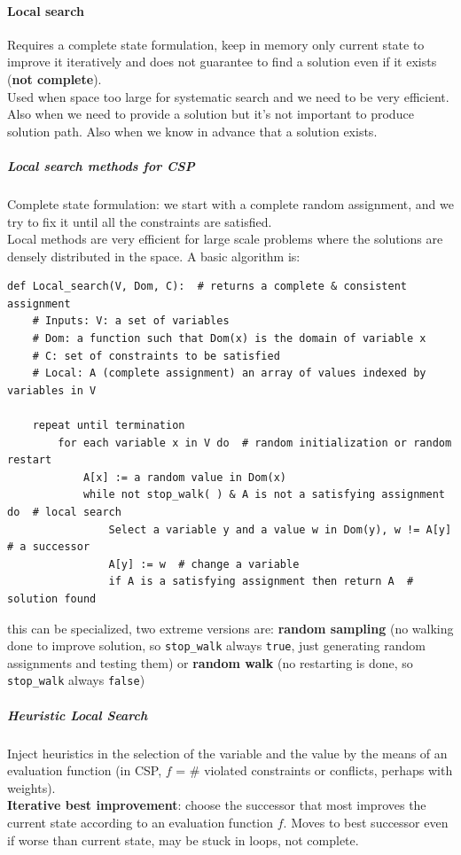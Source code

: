 \documentclass[10pt]{report}
\begin{document}
\paragraph{Local search} Requires a complete state formulation, keep in memory only current state to improve it iteratively and does not guarantee to find a solution even if it exists (\textbf{not complete}).\\
Used when space too large for systematic search and we need to be very efficient. Also when we need to provide a solution but it's not important to produce solution path. Also when we know in advance that a solution exists.
\subparagraph{Local search methods for CSP} Complete state formulation: we start with a complete random assignment, and we try to fix it until all the constraints are satisfied.\\
Local methods are very efficient for large scale problems where the solutions are densely distributed in the space. A basic algorithm is:
\begin{lstlisting}[style=myPython]
def Local_search(V, Dom, C):  # returns a complete & consistent assignment
	# Inputs: V: a set of variables
	# Dom: a function such that Dom(x) is the domain of variable x
	# C: set of constraints to be satisfied
	# Local: A (complete assignment) an array of values indexed by variables in V

	repeat until termination
		for each variable x in V do  # random initialization or random restart
			A[x] := a random value in Dom(x)
			while not stop_walk( ) & A is not a satisfying assignment do  # local search
				Select a variable y and a value w in Dom(y), w != A[y]  # a successor
				A[y] := w  # change a variable
				if A is a satisfying assignment then return A  # solution found
\end{lstlisting}
this can be specialized, two extreme versions are: \textbf{random sampling} (no walking done to improve solution, so \texttt{stop\_walk} always \texttt{true}, just generating random assignments and testing them) or \textbf{random walk} (no restarting is done, so \texttt{stop\_walk} always \texttt{false})
\subparagraph{Heuristic Local Search} Inject heuristics in the selection of the variable and the value by the means of an evaluation function (in CSP, $f$ = \# violated constraints or conflicts, perhaps with weights).\\
\textbf{Iterative best improvement}: choose the successor that most improves the current state according to an evaluation function $f$. Moves to best successor even if worse than current state, may be stuck in loops, not complete.
\end{document}
